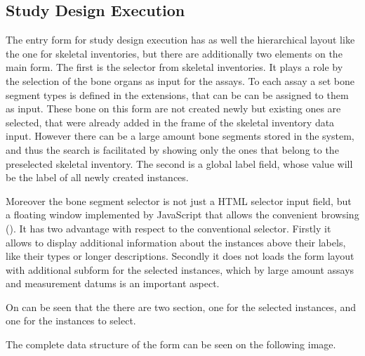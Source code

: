 \subsection{Study Design Execution}


The entry form for study design execution has as well the hierarchical layout like the one for skeletal inventories, but there are additionally two elements on the main form. The first is the selector from skeletal inventories. It plays a role by the selection of the bone organs as input for the assays. To each assay a set bone segment types is defined in the extensions, that can be can be assigned to them as input. These bone on this form are not created newly but existing ones are selected, that were already added in the frame of the skeletal inventory data input.  However there can be a large amount bone segments stored in the system, and thus the search is facilitated by showing only the ones that belong to the preselected skeletal inventory. The second is a global label field, whose value will be the label of all newly created instances.





Moreover the bone segment selector is not just a HTML selector input field, but a floating window implemented by JavaScript that allows the convenient browsing (). It has two advantage with respect to the conventional selector. Firstly it allows to display additional information about the instances above their labels, like their types or longer descriptions. Secondly it does not loads the form layout with additional subform for the selected instances, which by large amount assays and measurement datums is an important aspect.



On  can be seen that the there are two section, one for the selected instances, and one for the instances to select. 


The complete data structure of the form can be seen on the following image.



